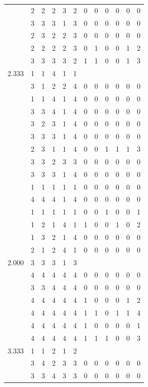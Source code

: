 \documentclass[]{book}
\theoremstyle{definition}
\theoremstyle{definition}
\theoremstyle{definition}
\theoremstyle{remark}
\begin{document}
\begin{table}
{\begin{tabular}[t]{rrrrrrrrrrrr}
 & 2 & 2 & 2 & 3 & 2 & 0 & 0 & 0 & 0 & 0 & 0\\
 & 3 & 3 & 3 & 1 & 3 & 0 & 0 & 0 & 0 & 0 & 0\\
 & 2 & 3 & 2 & 2 & 3 & 0 & 0 & 0 & 0 & 0 & 0\\
 & 2 & 2 & 2 & 2 & 3 & 0 & 1 & 0 & 0 & 1 & 2\\
 & 3 & 3 & 3 & 3 & 2 & 1 & 1 & 0 & 0 & 1 & 3\\
2.333 & 1 & 1 & 4 & 1 & 1 &  &  &  &  &  & \\
 & 3 & 1 & 2 & 2 & 4 & 0 & 0 & 0 & 0 & 0 & 0\\
 & 1 & 1 & 4 & 1 & 4 & 0 & 0 & 0 & 0 & 0 & 0\\
 & 3 & 3 & 4 & 1 & 4 & 0 & 0 & 0 & 0 & 0 & 0\\
 & 3 & 2 & 3 & 1 & 4 & 0 & 0 & 0 & 0 & 0 & 0\\
 & 3 & 3 & 3 & 1 & 4 & 0 & 0 & 0 & 0 & 0 & 0\\
 & 2 & 3 & 1 & 1 & 4 & 0 & 0 & 1 & 1 & 1 & 3\\
 & 3 & 3 & 2 & 3 & 3 & 0 & 0 & 0 & 0 & 0 & 0\\
 & 3 & 3 & 3 & 1 & 4 & 0 & 0 & 0 & 0 & 0 & 0\\
 & 1 & 1 & 1 & 1 & 1 & 0 & 0 & 0 & 0 & 0 & 0\\
 & 4 & 4 & 4 & 1 & 4 & 0 & 0 & 0 & 0 & 0 & 0\\
 & 1 & 1 & 1 & 1 & 1 & 0 & 0 & 1 & 0 & 0 & 1\\
 & 1 & 2 & 1 & 4 & 1 & 1 & 0 & 0 & 1 & 0 & 2\\
 & 1 & 3 & 2 & 1 & 4 & 0 & 0 & 0 & 0 & 0 & 0\\
 & 2 & 1 & 2 & 4 & 1 & 0 & 0 & 0 & 0 & 0 & 0\\
2.000 & 3 & 3 & 3 & 1 & 3 &  &  &  &  &  & \\
 & 4 & 4 & 4 & 4 & 4 & 0 & 0 & 0 & 0 & 0 & 0\\
 & 3 & 3 & 4 & 4 & 4 & 0 & 0 & 0 & 0 & 0 & 0\\
 & 4 & 4 & 4 & 4 & 4 & 1 & 0 & 0 & 0 & 1 & 2\\
 & 4 & 4 & 4 & 4 & 4 & 1 & 1 & 0 & 1 & 1 & 4\\
 & 4 & 4 & 4 & 4 & 4 & 1 & 0 & 0 & 0 & 0 & 1\\
 & 4 & 4 & 4 & 4 & 4 & 1 & 1 & 1 & 0 & 0 & 3\\
3.333 & 1 & 1 & 2 & 1 & 2 &  &  &  &  &  & \\
 & 3 & 4 & 2 & 3 & 3 & 0 & 0 & 0 & 0 & 0 & 0\\
 & 3 & 3 & 4 & 3 & 3 & 0 & 0 & 0 & 0 & 0 & 0\\

\end{tabular}}
\end{table}
\end{document}
